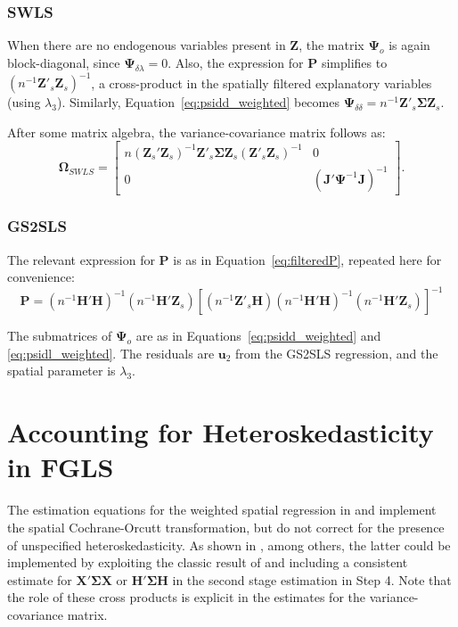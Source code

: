 \documentclass{article}
\begin{document}
\subsubsection{SWLS}
When there are no endogenous variables present in $\mathbf{Z}$, the matrix $\mathbf{\Psi}_o$
is again block-diagonal, since $\mathbf{\Psi}_{\delta \lambda} = 0$. Also, the expression for 
$\mathbf{P}$ simplifies to $(n^{-1} \mathbf{Z'}_s\mathbf{Z}_s )^{-1}$, a cross-product in the
spatially filtered explanatory variables (using $\lambda_3$). Similarly, 
Equation~\ref{eq:psidd_weighted} becomes $\mathbf{\Psi}_{\delta \delta} = n^{-1} \mathbf{Z'}_s \mathbf{\Sigma} \mathbf{Z}_s$.

After some matrix algebra, the variance-covariance matrix follows as:
\begin{equation*}
\mathbf{\Omega}_{SWLS} =
\left[
\begin{matrix}
n (\mathbf{Z}_s'\mathbf{Z}_s )^{-1} \mathbf{Z'}_s \mathbf{\Sigma}
  \mathbf{Z}_s (\mathbf{Z'}_s \mathbf{Z}_s )^{-1} & 0\\
 0 & ( \mathbf{J'} \mathbf{\Psi}^{-1} \mathbf{J} )^{-1}
 \end{matrix}
\right].
\end{equation*}

\subsubsection{GS2SLS}\label{ss:asyvargs2sls}


The relevant expression for $\mathbf{P}$ is as in Equation~\ref{eq:filteredP}, repeated here for convenience:
\begin{equation*}
\mathbf{P} = (n^{-1}\mathbf{H'H})^{-1} ( n^{-1} \mathbf{H'Z}_s ) 
        [ (n^{-1} \mathbf{Z'}_s \mathbf{H} ) (n^{-1} \mathbf{H'H} )^{-1} (n^{-1} \mathbf{H'Z}_s) ]^{-1}
\end{equation*}

The submatrices of $\mathbf{\Psi}_o$ are as in Equations~\ref{eq:psidd_weighted}
and \ref{eq:psidl_weighted}. The residuals are $\mathbf{u}_2$ from the GS2SLS regression,
and the spatial parameter is $\lambda_3$.



\section{Accounting for Heteroskedasticity in FGLS}
The estimation equations for the weighted spatial regression in 
\cite{KelejianPrucha:10} and \cite{Arraizetal:10}  implement the
spatial Cochrane-Orcutt transformation, but do not correct for the
presence of unspecified heteroskedasticity. As shown in \citet[p. 931]{Anselin:06},
among others, the latter could be
implemented by exploiting the
classic result of \cite{White:80} and including a consistent estimate
for $\mathbf{X' \Sigma X}$ or $\mathbf{H' \Sigma H}$ in the second stage
estimation in Step 4. Note that the role of these cross products is explicit
in the estimates for the variance-covariance matrix.
\end{document}
